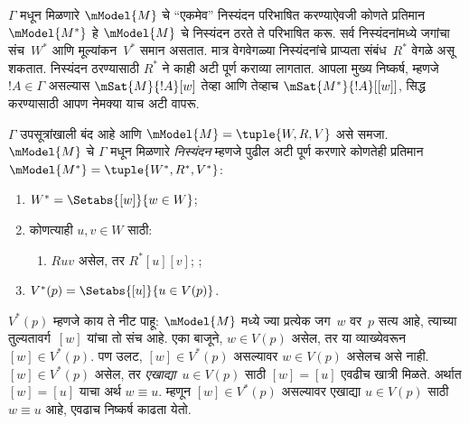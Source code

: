 \documentclass[../../../include/open-logic-section]{subfiles}
\begin{document}


$\Gamma$ मधून मिळणारे $\mModel{M}$ चे “एकमेव” निस्यंदन
परिभाषित करण्याऐवजी कोणते प्रतिमान~$\mModel{M^*}$ हे
$\mModel{M}$ चे निस्यंदन ठरते ते परिभाषित करू.
सर्व निस्यंदनांमध्ये जगांचा संच~$W^*$ आणि मूल्यांकन~$V^*$
समान असतात. मात्र वेगवेगळ्या निस्यंदनांचे प्राप्यता
संबंध~$R^*$ वेगळे असू शकतात. निस्यंदन ठरण्यासाठी
$R^*$ ने काही अटी पूर्ण कराव्या लागतात. आपला मुख्य
निष्कर्ष, म्हणजे $!A \in \Gamma$ असल्यास
$\mSat{M}{!A}[w]$ तेव्हा आणि तेव्हाच
$\mSat{M^*}{!A}[{[w]}]$, सिद्ध करण्यासाठी
आपण नेमक्या याच अटी वापरू.

\begin{defn}
  $\Gamma$ उपसूत्रांखाली बंद आहे आणि
  $\mModel{M} = \tuple{W, R, V}$ असे समजा.
  $\mModel{M}$ चे $\Gamma$ मधून मिळणारे
  \emph{निस्यंदन} म्हणजे पुढील अटी पूर्ण करणारे
  कोणतेही प्रतिमान $\mModel{M^*} = \tuple{W^*,R^*,V^*}$:
  \begin{enumerate}
  \item $W^* = \Setabs{[w]}{w \in W}$;
  \item {}%
    कोणत्याही $u,v \in W$ साठी:
    \begin{enumerate}
    \item {}%
      $Ruv$ असेल, तर $R^*[u][v]$;
    ;
    \end{enumerate}
  \item $V^*(p) = \Setabs{[u]}{u \in V(p)}$.
  \end{enumerate}
\end{defn}

$V^*(p)$ म्हणजे काय ते नीट पाहू: $\mModel{M}$ मध्ये
ज्या प्रत्येक जग~$w$ वर~$p$ सत्य आहे, त्याच्या
तुल्यतावर्ग~$[w]$ यांचा तो संच आहे. एका बाजूने,
$w \in V(p)$ असेल, तर
या व्याख्येवरून $[w] \in V^*(p)$. पण उलट,
$[w] \in V^*(p)$ असल्यावर $w \in V(p)$ असेलच असे नाही.
$[w] \in V^*(p)$ असेल, तर \emph{एखाद्या}~$u \in V(p)$
साठी $[w] = [u]$ एवढीच खात्री मिळते. अर्थात
$[w] = [u]$ याचा अर्थ $w \equiv u$. म्हणून
$[w] \in V^*(p)$ असल्यावर एखाद्या $u \in V(p)$
साठी $w \equiv u$ आहे, एवढाच निष्कर्ष काढता येतो.
\end{document}
